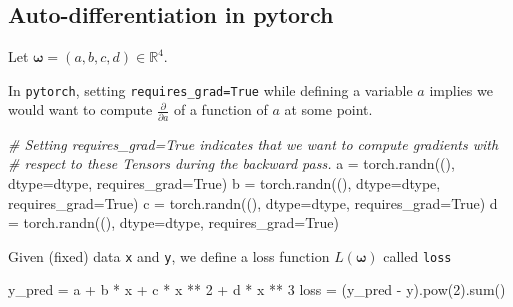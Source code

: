 \documentclass[
]{article}
\newenvironment{Shaded}{}{}
\newcommand{\BuiltInTok}[1]{\textcolor[rgb]{0.00,0.50,0.00}{#1}}
\newcommand{\CommentTok}[1]{\textcolor[rgb]{0.38,0.63,0.69}{\textit{#1}}}
\newcommand{\DecValTok}[1]{\textcolor[rgb]{0.25,0.63,0.44}{#1}}
\newcommand{\NormalTok}[1]{#1}
\newcommand{\OperatorTok}[1]{\textcolor[rgb]{0.40,0.40,0.40}{#1}}
\newcommand{\VariableTok}[1]{\textcolor[rgb]{0.10,0.09,0.49}{#1}}
\begin{document}
\hypertarget{auto-differentiation-in-pytorch}{%
\subsection{Auto-differentiation in
pytorch}\label{auto-differentiation-in-pytorch}}

Let \(\boldsymbol{\omega}= (a, b, c, d) \in \mathbb{R}^4\).

In \texttt{pytorch}, setting \texttt{requires\_grad=True} while defining
a variable \(a\) implies we would want to compute
\(\frac{\partial}{\partial a}\) of a function of \(a\) at some point.

\begin{Shaded}
\begin{Highlighting}[]
\CommentTok{\# Setting requires\_grad=True indicates that we want to compute gradients with}
\CommentTok{\# respect to these Tensors during the backward pass.}
\NormalTok{a }\OperatorTok{=}\NormalTok{ torch.randn((), dtype}\OperatorTok{=}\NormalTok{dtype, requires\_grad}\OperatorTok{=}\VariableTok{True}\NormalTok{)}
\NormalTok{b }\OperatorTok{=}\NormalTok{ torch.randn((), dtype}\OperatorTok{=}\NormalTok{dtype, requires\_grad}\OperatorTok{=}\VariableTok{True}\NormalTok{)}
\NormalTok{c }\OperatorTok{=}\NormalTok{ torch.randn((), dtype}\OperatorTok{=}\NormalTok{dtype, requires\_grad}\OperatorTok{=}\VariableTok{True}\NormalTok{)}
\NormalTok{d }\OperatorTok{=}\NormalTok{ torch.randn((), dtype}\OperatorTok{=}\NormalTok{dtype, requires\_grad}\OperatorTok{=}\VariableTok{True}\NormalTok{)}
\end{Highlighting}
\end{Shaded}

Given (fixed) data \texttt{x} and \texttt{y}, we define a loss function
\(L(\boldsymbol{\omega})\) called \texttt{loss}

\begin{Shaded}
\begin{Highlighting}[]
\NormalTok{y\_pred }\OperatorTok{=}\NormalTok{ a }\OperatorTok{+}\NormalTok{ b }\OperatorTok{*}\NormalTok{ x }\OperatorTok{+}\NormalTok{ c }\OperatorTok{*}\NormalTok{ x }\OperatorTok{**} \DecValTok{2} \OperatorTok{+}\NormalTok{ d }\OperatorTok{*}\NormalTok{ x }\OperatorTok{**} \DecValTok{3}
\NormalTok{loss }\OperatorTok{=}\NormalTok{ (y\_pred }\OperatorTok{{-}}\NormalTok{ y).}\BuiltInTok{pow}\NormalTok{(}\DecValTok{2}\NormalTok{).}\BuiltInTok{sum}\NormalTok{()}
\end{Highlighting}
\end{Shaded}
\end{document}
